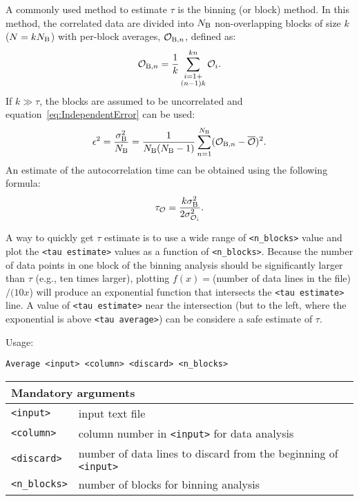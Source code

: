 A commonly used method to estimate $\tau$
is the binning (or block) method. In this method, the correlated data are
divided into $N_{\mathrm{B}}$ non-overlapping blocks of size $k$ ($N=k
N_{\mathrm{B}}$) with per-block averages, $\mathcal{O}_{\mathrm{B},n}$,
defined as:
\begin{equation} \label{eq:BlockAverage} %
  \mathcal{O}_{\mr{B},n} = \frac{1}{k}
    \sum^{k n}_{\substack{i=1+\\(n-1)k}} \mathcal{O}_i.
\end{equation} %
If $k\gg\tau$, the blocks are assumed to be uncorrelated and
equation~\eqref{eq:IndependentError} can be used:
\begin{equation} \label{eq:Error} %
  \epsilon^2 =
  \frac{\sigma^2_{\mr{B}} }{N_{\mr{B}} } = \frac{1}{N_{\mr{B}} (N_{\mr{B}}
  -1)} \sum^{N_{\mr{B}} }_{n=1} (\mathcal{O}_{\mr{B},n} -
  \overline{\mathcal{O}})^2.
\end{equation} %
An estimate of the autocorrelation time can be obtained using the following
formula:
\begin{equation} \label{eq:tau} %
  \tau_{\mathcal{O}} = \frac{k \sigma^2_{\mr{B}} }{2
  \sigma^2_{\mathcal{O}_i}}.
\end{equation} %

A way to quickly get $\tau$ estimate is to use a wide range
of \texttt{<n\_blocks>} value and plot the \texttt{<tau estimate>} values
as a function of \texttt{<n\_blocks>}. Because the number of data points in
one block of the binning analysis should be significantly larger than
$\tau$ (e.g., ten times larger), plotting $f(x)=$(number of data lines in
the file)$/(10x$) will produce an exponential function that intersects the
\texttt{<tau estimate>} line. A value of \texttt{<tau estimate>} near the
intersection (but to the left, where the exponential is above \texttt{<tau
average>}) can be considere a safe estimate of $\tau$.

Usage:

\vspace{1em}
\noindent
\texttt{Average <input> <column> <discard> <n\_blocks>}

\noindent
\begin{longtable}{p{}p{}}
  \toprule
  \multicolumn{2}{l}{Mandatory arguments} \\
  \midrule
  \texttt{<input>} & input text file \\
  \texttt{<column>} & column number in \texttt{<input>} for data analysis \\
  \texttt{<discard>} & number of data lines to discard from the beginning of
    \texttt{<input>} \\
  \texttt{<n\_blocks>} & number of blocks for binning analysis \\
  \bottomrule
\end{longtable}
